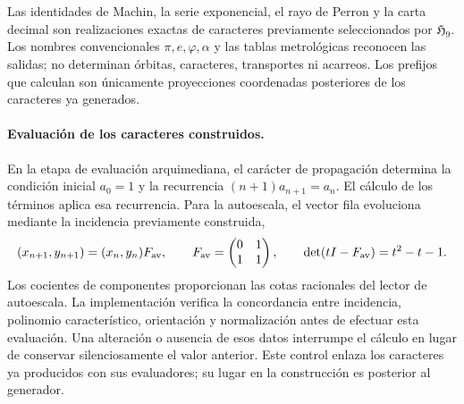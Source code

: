 \begin{corollary}
\label{cor:c27-generacion-reconocimiento}
Las identidades de Machin, la serie exponencial, el rayo de Perron y la carta
decimal son realizaciones exactas de caracteres previamente seleccionados
por \(\mathfrak H_9\). Los nombres convencionales \(\pi,e,\varphi,\alpha\)
y las tablas metrológicas reconocen las salidas; no determinan órbitas,
caracteres, transportes ni acarreos. Los prefijos que calculan son únicamente
proyecciones coordenadas posteriores de los caracteres ya generados.
\end{corollary}

\paragraph{Evaluación de los caracteres construidos.}
En la etapa de evaluación arquimediana, el carácter de propagación
determina la condición inicial \(a_0=1\) y la recurrencia
\((n+1)a_{n+1}=a_n\). El cálculo de los términos aplica esa recurrencia.
Para la autoescala, el vector fila evoluciona mediante la incidencia
previamente construida,
\[
 (x_{n+1},y_{n+1})=(x_n,y_n)F_{\rm av},
 \qquad
 F_{\rm av}=\begin{pmatrix}0&1\\1&1\end{pmatrix},
 \qquad
 \det(tI-F_{\rm av})=t^2-t-1.
\]
Los cocientes de componentes proporcionan las cotas racionales del
lector de autoescala. La implementación verifica la concordancia entre
incidencia, polinomio característico, orientación y normalización antes
de efectuar esta evaluación. Una alteración o ausencia de esos datos
interrumpe el cálculo en lugar de conservar silenciosamente el valor
anterior. Este control enlaza los caracteres ya producidos con sus
evaluadores; su lugar en la construcción es posterior al generador.
